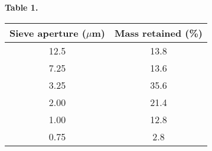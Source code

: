 \textbf{Table 1.}
\begin{center}
\begin{tabular}{|c|c|}
\hline
Sieve aperture ($\mu$m) & Mass retained (\%) \\
\hline
12.5 & 13.8 \\
7.25 & 13.6 \\
3.25 & 35.6 \\
2.00 & 21.4 \\
1.00 & 12.8 \\
0.75 & 2.8 \\
\hline
\end{tabular}
\end{center}